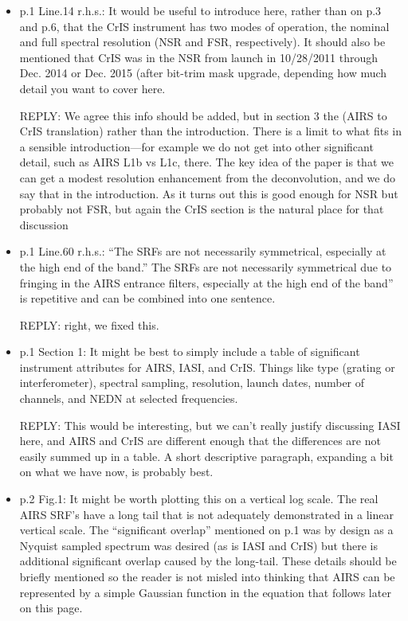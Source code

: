 \documentclass[11pt]{article}
\newcommand {\reply} {\mbox{\small REPLY}}
\begin{document}
\begin{itemize}

\item p.1 Line.14 r.h.s.: It would be useful to introduce here,
  rather than on p.3 and p.6, that the CrIS instrument has two modes
  of operation, the nominal and full spectral resolution (NSR and
  FSR, respectively).  It should also be mentioned that CrIS was in
  the NSR from launch in 10/28/2011 through Dec. 2014 or Dec. 2015
  (after bit-trim mask upgrade, depending how much detail you want
  to cover here.

  \reply: We agree this info should be added, but in section 3 the
  (AIRS to CrIS translation) rather than the introduction.  There is
  a limit to what fits in a sensible introduction---for example we
  do not get into other significant detail, such as AIRS L1b vs L1c,
  there.  The key idea of the paper is that we can get a modest
  resolution enhancement from the deconvolution, and we do say that
  in the introduction.  As it turns out this is good enough for NSR
  but probably not FSR, but again the CrIS section is the natural
  place for that discussion
  
\item p.1 Line.60 r.h.s.: ``The SRFs are not necessarily
  symmetrical, especially at the high end of the band.''  The SRFs
  are not necessarily symmetrical due to fringing in the AIRS
  entrance filters, especially at the high end of the band” is
  repetitive and can be combined into one sentence.

  \reply: right, we fixed this.

\item p.1 Section 1: It might be best to simply include a table of
  significant instrument attributes for AIRS, IASI, and CrIS. Things
  like type (grating or interferometer), spectral sampling,
  resolution, launch dates, number of channels, and NEDN at selected
  frequencies.

  \reply: This would be interesting, but we can't really justify
  discussing IASI here, and AIRS and CrIS are different enough that
  the differences are not easily summed up in a table.  A short
  descriptive paragraph, expanding a bit on what we have now, is
  probably best.
  
\item p.2 Fig.1: It might be worth plotting this on a vertical log
  scale. The real AIRS SRF’s have a long tail that is not adequately
  demonstrated in a linear vertical scale. The “significant overlap”
  mentioned on p.1 was by design as a Nyquist sampled spectrum was
  desired (as is IASI and CrIS) but there is additional significant
  overlap caused by the long-tail. These details should be briefly
  mentioned so the reader is not misled into thinking that AIRS can
  be represented by a simple Gaussian function in the equation that
  follows later on this page.


\end{itemize}
\end{document}
